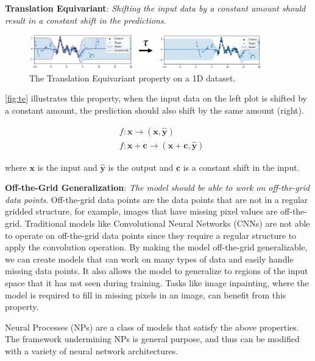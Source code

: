 \documentclass[../../main.tex]{subfiles}
\begin{document}
\textbf{Translation Equivariant}: \emph{Shifting the input data by a constant amount should result in a constant shift in the predictions}. 

\begin{figure}[H]
	\centering
	\includegraphics[width=0.9\textwidth]{./te.PNG}
	\caption{The Translation Equivariant property on a 1D dataset.}
	\label{fig:te}
\end{figure}


\autoref{fig:te} illustrates this property, when the input data on the left plot is shifted by a constant amount, the prediction should also shift by the same amount (right).

\begin{align}
	&f: \bm{x} \rightarrow (\bm{x}, \bm{\hat{y}}) \\
	&f: \bm{x} + \bm{c} \rightarrow (\bm{x} + \bm{c}, \bm{\hat{y}})
\end{align}

where $\bm{x}$ is the input and $\bm{\hat{y}}$ is the output and $\bm{c}$ is a constant shift in the input.


\textbf{Off-the-Grid Generalization}: \emph{The model should be able to work on off-the-grid data points}. Off-the-grid data points are the data points that are not in a regular gridded structure, for example, images that have missing pixel values are off-the-grid. Traditional models like Convolutional Neural Networks (CNNs) are not able to operate on off-the-grid data points since they require a regular structure to apply the convolution operation. By making the model off-the-grid generalizable, we can create models that can work on many types of data and easily handle missing data points. It also allows the model to generalize to regions of the input space that it has not seen during training. Tasks like image inpainting, where the model is required to fill in missing pixels in an image, can benefit from this property.


Neural Processes (NPs) \cite{garnelo2018neural} are a class of models that satisfy the above properties. The framework undermining NPs is general purpose, and thus can be modified with a variety of neural network architectures. 
\end{document}
